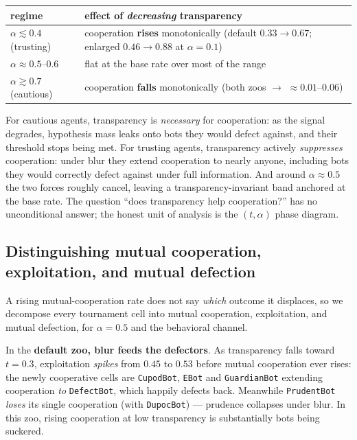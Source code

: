 \documentclass[11pt]{article}
\newcommand{\zoobot}[1]{\texttt{#1}}
\newcommand{\dupoc}{\zoobot{DupocBot}}
\newcommand{\cupod}{\zoobot{CupodBot}}
\begin{document}
\begin{center}
\small
\begin{tabular}{lp{}}
\toprule
regime & effect of \emph{decreasing} transparency \\
\midrule
$\alpha \lesssim 0.4$ (trusting) & cooperation \textbf{rises} monotonically
  (default $0.33 \to 0.67$; enlarged $0.46 \to 0.88$ at $\alpha=0.1$) \\
$\alpha \approx 0.5$--$0.6$ & flat at the base rate over most of the range \\
$\alpha \gtrsim 0.7$ (cautious) & cooperation \textbf{falls} monotonically
  (both zoos $\to$ $\approx 0.01$--$0.06$) \\
\bottomrule
\end{tabular}
\end{center}

For cautious agents, transparency is \emph{necessary} for cooperation:
as the signal degrades, hypothesis mass leaks onto bots they would defect
against, and their threshold stops being met. For trusting agents,
transparency actively \emph{suppresses} cooperation: under blur they
extend cooperation to nearly anyone, including bots they would correctly
defect against under full information. And around $\alpha \approx 0.5$
the two forces roughly cancel, leaving a transparency-invariant band
anchored at the base rate. The question ``does transparency help
cooperation?'' has no unconditional answer; the honest unit of analysis
is the $(t, \alpha)$ phase diagram.

\subsection{Distinguishing mutual cooperation, exploitation, and mutual defection}

A rising mutual-cooperation rate does not say \emph{which} outcome it
displaces, so we decompose every tournament cell into mutual cooperation,
exploitation, and mutual defection, for $\alpha = 0.5$ and the behavioral channel.

In the \textbf{default zoo, blur feeds the defectors}. As transparency
falls toward $t = 0.3$, exploitation \emph{spikes} from $0.45$ to $0.53$
before mutual cooperation ever rises: the newly cooperative cells are
\cupod, \zoobot{EBot} and \zoobot{GuardianBot} extending cooperation
\emph{to} \zoobot{DefectBot}, which happily defects back. Meanwhile
\zoobot{PrudentBot} \emph{loses} its single cooperation (with \dupoc) ---
prudence collapses under blur. In this zoo, rising cooperation at low
transparency is substantially bots being suckered.
\end{document}
